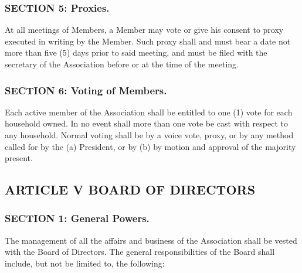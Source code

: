\subsubsection{SECTION 5: Proxies.}
At all meetings of Members, a Member may vote or give his consent to proxy
executed in writing by the Member. Such proxy shall and must bear a date
not more than five (5) days prior to said meeting, and must be filed with
the secretary of the Association before or at the time of the meeting.

\subsubsection{SECTION 6: Voting of Members.}
Each active member of the Association shall be entitled to one (1) vote
for each household owned. In no event shall more than one vote be cast
with respect to any household. Normal voting shall be by a voice vote,
proxy, or by any method called for by the (a) President, or by (b)
by motion and approval of the majority present.

\subsection{ARTICLE V BOARD OF DIRECTORS}

\subsubsection{SECTION 1: General Powers.}
The management of all the affairs and business of the Association shall
be vested with the Board of Directors. The general responsibilities of
the Board shall include, but not be limited to, the following:

